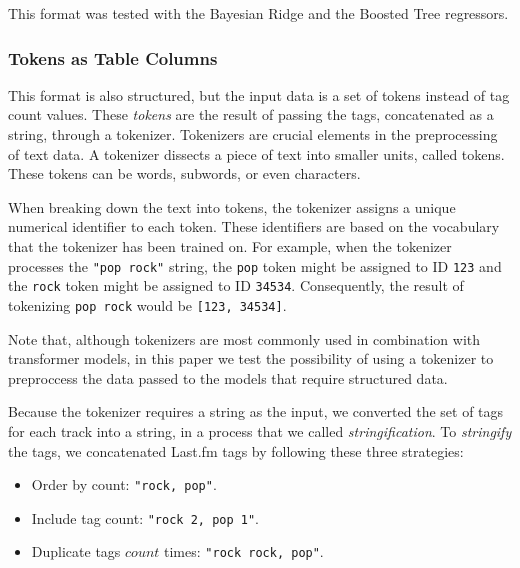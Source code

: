 \documentclass[sn-mathphys]{sn-jnl}%
\theoremstyle{thmstyleone}%
\theoremstyle{thmstyletwo}%
\theoremstyle{thmstylethree}%
\begin{document}
This format was tested with the Bayesian Ridge and the Boosted Tree regressors.



\subsubsection{Tokens as Table Columns}

This format is also structured, but the input data is a set of tokens instead of tag count values.
These \emph{tokens} are the result of passing the tags, concatenated as a string, through a tokenizer.
Tokenizers are crucial elements in the preprocessing of text data.
A tokenizer dissects a piece of text into smaller units, called tokens.
These tokens can be words, subwords, or even characters.


When breaking down the text into tokens, the tokenizer assigns a unique numerical identifier to each token.
These identifiers are based on the vocabulary that the tokenizer has been trained on.
For example, when the tokenizer processes the \verb|"pop rock"| string, the \verb|pop| token might be assigned to ID \verb|123|
and the \verb|rock| token might be assigned to ID \verb|34534|.
Consequently, the result of tokenizing \verb|pop rock| would be \verb|[123, 34534]|.

Note that, although tokenizers are most commonly used in combination with transformer models, in this paper we test the possibility of using a tokenizer to preproccess the data passed to the models that require structured data.

Because the tokenizer requires a string as the input, we converted the set of tags for each track into a string, in a process that we called \emph{stringification}.
To \emph{stringify} the tags, we concatenated Last.fm tags by following these three strategies:

\begin{itemize}
      \item Order by count: \verb|"rock, pop"|.
      \item Include tag count: \verb|"rock 2, pop 1"|.
      \item Duplicate tags $count$ times: \verb|"rock rock, pop"|.
\end{itemize}
\end{document}

